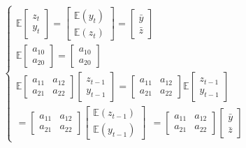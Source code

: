 \begin{equation}
\left\{ 
\begin{array}{l}
\mathbb{E} \begin{bmatrix}z_t \\y_t\end{bmatrix} 
= 
\begin{bmatrix}\mathbb{E}(y_t) \\\mathbb{E}(z_t)
\end{bmatrix} 
=
\begin{bmatrix}\bar{y} \\\bar{z}\end{bmatrix}
\\[15pt]
\mathbb{E} \begin{bmatrix}a_{10} \\a_{20}\end{bmatrix}
=
\begin{bmatrix}a_{10} \\a_{20}\end{bmatrix}
\\[15pt]
\mathbb{E}\begin{bmatrix}
a_{11} & a_{12}\\a_{21} & a_{22}\end{bmatrix}
\begin{bmatrix}z_{t-1} \\ y_{t-1}\end{bmatrix}
=
\begin{bmatrix}
a_{11} & a_{12}\\a_{21} & a_{22}\end{bmatrix}
\mathbb{E}\begin{bmatrix}z_{t-1} \\ y_{t-1}\end{bmatrix}
\\[15pt]
=
\begin{bmatrix}
a_{11} & a_{12}\\a_{21} & a_{22}\end{bmatrix}
\begin{bmatrix} \mathbb{E}(z_{t-1})
\\ \mathbb{E}(y_{t-1})\end{bmatrix}
~~ = 
\begin{bmatrix}
a_{11} & a_{12}\\a_{21} & a_{22}\end{bmatrix}
\begin{bmatrix}\bar{y} \\\bar{z}\end{bmatrix}
\end{array} 
\right.
\end{equation}

